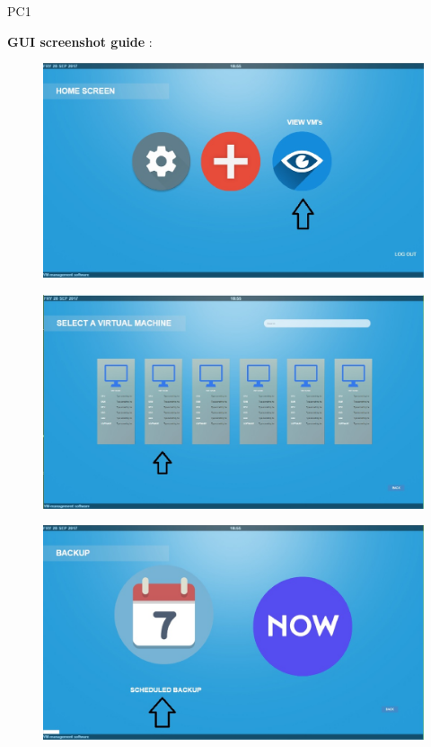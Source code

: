 \begin{lyxlist}{PC1}
{\item [\textbf{GUI screenshot guide}]:\\
}


\begin{figure}[H]
\centering
\includegraphics[width=170mm]{images/createVMMod1.eps}
\caption{\label{overflow}}
\end{figure}


\begin{figure}[H]
\centering
\includegraphics[width=170mm]{images/createVMMod2.eps}
\caption{\label{overflow}}
\end{figure}

\begin{figure}[H]
\centering
\includegraphics[width=170mm]{images/schback3.eps}
\caption{\label{overflow}}
\end{figure}



\end{lyxlist}
